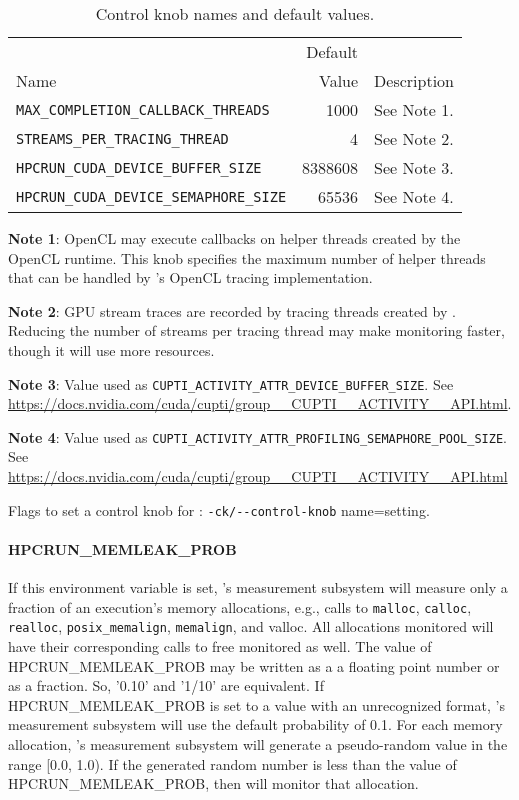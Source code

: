 \begin{table}[t]
\begin{center}
\begin{tabular}{|l|r|p{2in}|}\hline
 & Default & \\
Name & Value & Description \\\hline\hline
\verb|MAX_COMPLETION_CALLBACK_THREADS| & 1000 &  See Note 1.  \\\hline
\verb|STREAMS_PER_TRACING_THREAD| &  4  & See Note 2.  \\\hline
\verb|HPCRUN_CUDA_DEVICE_BUFFER_SIZE| & 8388608 & See Note 3.  \\\hline
\verb|HPCRUN_CUDA_DEVICE_SEMAPHORE_SIZE| & 65536 & See Note 4. \\\hline
\hline
\end{tabular}
\begin{flushleft}
{\bf Note 1}:  OpenCL may execute callbacks on helper threads created by the OpenCL runtime. This knob specifies the maximum number of helper threads that can be handled by \hpcrun{}'s OpenCL tracing implementation.

{\bf Note 2}: GPU stream traces are recorded by tracing threads created by \hpcrun{}. Reducing the number of streams per \hpcrun{} tracing thread may make monitoring faster, though it will use more resources.

{\bf Note 3}: Value used as {\tt CUPTI\_ACTIVITY\_ATTR\_DEVICE\_BUFFER\_SIZE}. See \url{https://docs.nvidia.com/cuda/cupti/group__CUPTI__ACTIVITY__API.html}.

{\bf Note 4}: Value used as \verb|CUPTI_ACTIVITY_ATTR_PROFILING_SEMAPHORE_POOL_SIZE|. See \url{https://docs.nvidia.com/cuda/cupti/group__CUPTI__ACTIVITY__API.html}
\end{flushleft}
\caption{Control knob names and default values.}
\label{knob-names}
\end{center}
\end{table}

\parg
Flags to set a control knob for \hpcrun: \verb|-ck/--control-knob|  name=setting.


\paragraph{HPCRUN\_MEMLEAK\_PROB}

If this environment variable is set, \HPCToolkit's measurement
subsystem will measure only a fraction of an execution’s memory
allocations, e.g., calls to \verb|malloc|, \verb|calloc|, \verb|realloc|,
\verb|posix_memalign|, \verb|memalign|, and valloc. All allocations
monitored will have their corresponding calls to free monitored as
well. The value of HPCRUN\_MEMLEAK\_PROB may be written as a a
floating point number or as a fraction.  So, '0.10' and '1/10' are
equivalent. If HPCRUN\_MEMLEAK\_PROB is set to a value with an
unrecognized format, \HPCToolkit's measurement subsystem will use the
default probability of 0.1. For each memory allocation, \HPCToolkit's
measurement subsystem will generate a pseudo-random value in the range
[0.0, 1.0). If the generated random number is less than the value
of HPCRUN\_MEMLEAK\_PROB, then \HPCToolkit{} will monitor that
allocation.

